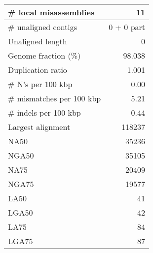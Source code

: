 \documentclass[12pt,a4paper]{article}
\begin{document}
\begin{table}[ht]
\begin{center}
\begin{tabular}{|l*{1}{|r}|}
\# local misassemblies & 11 \\ \hline
\# unaligned contigs & 0 + 0 part \\ \hline
Unaligned length & 0 \\ \hline
Genome fraction (\%) & 98.038 \\ \hline
Duplication ratio & 1.001 \\ \hline
\# N's per 100 kbp & 0.00 \\ \hline
\# mismatches per 100 kbp & 5.21 \\ \hline
\# indels per 100 kbp & 0.44 \\ \hline
Largest alignment & 118237 \\ \hline
NA50 & 35236 \\ \hline
NGA50 & 35105 \\ \hline
NA75 & 20409 \\ \hline
NGA75 & 19577 \\ \hline
LA50 & 41 \\ \hline
LGA50 & 42 \\ \hline
LA75 & 84 \\ \hline
LGA75 & 87 \\ \hline
\end{tabular}
\end{center}
\end{table}
\end{document}
